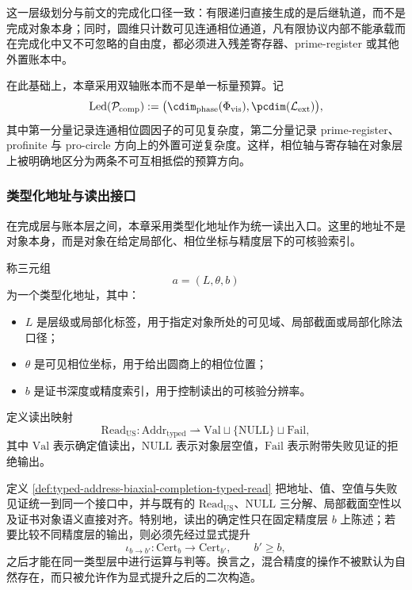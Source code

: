 这一层级划分与前文的完成化口径一致：有限递归直接生成的是后继轨道，而不是完成对象本身；同时，圆维只计数可见连通相位通道，凡有限协议内部不能承载而在完成化中又不可忽略的自由度，都必须进入残差寄存器、prime-register 或其他外置账本中。

在此基础上，本章采用双轴账本而不是单一标量预算。记
\[
\mathrm{Led}(\mathcal P_{\mathrm{comp}})
:=
\bigl(
\cdim_{\mathrm{phase}}(\Phi_{\mathrm{vis}}),
\pcdim(\mathcal L_{\mathrm{ext}})
\bigr),
\]
其中第一分量记录连通相位圆因子的可见复杂度，第二分量记录 prime-register、profinite 与 pro-circle 方向上的外置可逆复杂度。这样，相位轴与寄存轴在对象层上被明确地区分为两条不可互相抵偿的预算方向。

\subsubsection{类型化地址与读出接口}\label{subsubsec:typed-address-biaxial-completion-typed-address}
在完成层与账本层之间，本章采用类型化地址作为统一读出入口。这里的地址不是对象本身，而是对象在给定局部化、相位坐标与精度层下的可核验索引。

\begin{definition}[类型化地址]\label{def:typed-address-biaxial-completion-typed-address}
称三元组
\[
a=(L,\theta,b)
\]
为一个类型化地址，其中：
\begin{itemize}
  \item \(L\) 是层级或局部化标签，用于指定对象所处的可见域、局部截面或局部化除法口径；
  \item \(\theta\) 是可见相位坐标，用于给出圆商上的相位位置；
  \item \(b\) 是证书深度或精度索引，用于控制读出的可核验分辨率。
\end{itemize}
\end{definition}

\begin{definition}[类型化读出]\label{def:typed-address-biaxial-completion-typed-read}
定义读出映射
\[
\mathrm{Read}_{\mathrm{US}}:\mathrm{Addr}_{\mathrm{typed}}
\rightharpoonup
\mathrm{Val}\sqcup\{\mathrm{NULL}\}\sqcup \mathrm{Fail},
\]
其中 \(\mathrm{Val}\) 表示确定值读出，\(\mathrm{NULL}\) 表示对象层空值，\(\mathrm{Fail}\) 表示附带失败见证的拒绝输出。
\end{definition}

定义 \ref{def:typed-address-biaxial-completion-typed-read} 把地址、值、空值与失败见证统一到同一个接口中，并与既有的 \(\mathrm{Read}_{\mathrm{US}}\)、\(\mathrm{NULL}\) 三分解、局部截面空性以及证书对象语义直接对齐。特别地，读出的确定性只在固定精度层 \(b\) 上陈述；若要比较不同精度层的输出，则必须先经过显式提升
\[
\iota_{b\to b'}:\mathrm{Cert}_b\longrightarrow \mathrm{Cert}_{b'},
\qquad
b'\ge b,
\]
之后才能在同一类型层中进行运算与判等。换言之，混合精度的操作不被默认为自然存在，而只被允许作为显式提升之后的二次构造。

